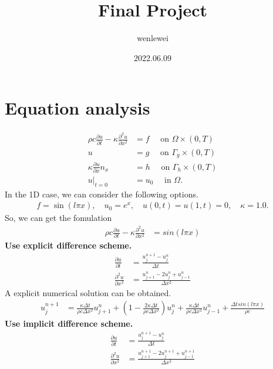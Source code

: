 \documentclass[a4paper]{article}
\title{\textbf{Final Project}}
\author{\songti wenlewei}
\date{2022.06.09}
\begin{document}
\maketitle
    \section{Equation analysis}
        \begin{align*}
            \rho c \frac{\partial u}{\partial t} - \kappa  \frac{\partial^2 u}{\partial x^2} &= f \quad \mbox{ on } \Omega \times (0,T) \\
            u &= g \quad \mbox{ on } \Gamma_{g} \times (0,T) \\
            \kappa \frac{\partial u}{\partial x} n_{x}  &= h \quad \mbox{ on } \Gamma_h \times (0,T) \\
            u|_{t=0} &= u_0 \quad \mbox{ in } \Omega.
        \end{align*}
        In the 1D case, we can consider the following options.
        \begin{align*}
            f = \sin(l \pi x), \quad u_0 = e^{x}, \quad u(0,t) = u(1,t) = 0, \quad \kappa = 1.0. 
        \end{align*}
        So, we can get the fomulation
        \begin{align*}
            \rho c \frac{\partial u}{\partial t} - \kappa  \frac{\partial^2 u}{\partial x^2} &= sin(l\pi x)
        \end{align*}
        \textbf{Use explicit difference scheme.}
        \begin{align*}
            \frac{\partial u}{\partial t} &= \frac{u^{n+1}_j - u^n_j}{\Delta t} \\
            \frac{\partial^2 u}{\partial x^2} &= \frac{u^n_{j+1}-2u^n_j+u^n_{j-1}}{\Delta x^2}
        \end{align*}
        A explicit numerical solution can be obtained.
        \begin{align*}
            u^{n+1}_j &= \frac{\kappa \Delta t}{\rho c \Delta x^2} u^n_{j+1} + (1 - \frac{2\kappa \Delta t}{\rho c \Delta x^2})u^n_j + \frac{\kappa \Delta t}{\rho c \Delta x^2}u^n_{j-1} + \frac{\Delta t sin(l \pi x)}{\rho c}
        \end{align*}
        \textbf{Use implicit difference scheme.}
        \begin{align*}
            \frac{\partial u}{\partial t} &= \frac{u^{n+1}_j - u^n_j}{\Delta t} \\
            \frac{\partial^2 u}{\partial x^2} &= \frac{u^{n+1}_{j+1}-2u^{n+1}_j+u^{n+1}_{j-1}}{\Delta x^2}
        \end{align*}
\end{document}
